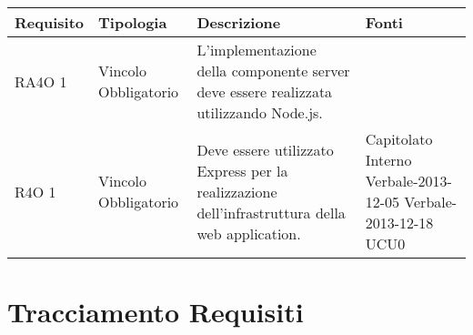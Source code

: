       \begin{center}
      \bgroup
      \def\arraystretch{1.8}
      \begin{longtable}{ | l | p{2cm} | p{5cm} | p{1.7cm} |}
    
      \cellcolor[gray]{0.9} \textbf{Requisito} & \cellcolor[gray]{0.9} \textbf{Tipologia} 
      & \cellcolor[gray]{0.9} \textbf{Descrizione} & \cellcolor[gray]{0.9} \textbf{Fonti} \\ \hline
      
        RA4O 1 & Vincolo \newline  Obbligatorio  & L’implementazione della componente server deve essere realizzata utilizzando Node.js. &  \\ \hline      
        R4O 1 & Vincolo \newline  Obbligatorio  & Deve essere utilizzato Express per la realizzazione dell’infrastruttura della web application. &  Capitolato \newline  Interno \newline  Verbale-2013-12-05 \newline  Verbale-2013-12-18 \newline  UCU0 \newline  \\ \hline
      \end{longtable}
      \egroup
      \end{center}  
\clearpage
\section{Tracciamento Requisiti}
